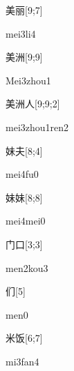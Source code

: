 \begin{verbete}[mei3li4]{美丽}[9;7]
\begin{pronuncia}{mei3li4}
\end{pronuncia}
\end{verbete}

\begin{verbete}{美洲}[9;9]
\begin{pronuncia}{Mei3zhou1}
\end{pronuncia}
\end{verbete}

\begin{verbete}{美洲人}[9;9;2]
\begin{pronuncia}{mei3zhou1ren2}
\end{pronuncia}
\end{verbete}

\begin{verbete}[mei4fu0]{妹夫}[8;4]
\begin{pronuncia}{mei4fu0}
\end{pronuncia}
\end{verbete}

\begin{verbete}{妹妹}[8;8]
\begin{pronuncia}{mei4mei0}
\end{pronuncia}
\end{verbete}

\begin{verbete}{门口}[3;3]
\begin{pronuncia}{men2kou3}
\end{pronuncia}
\end{verbete}

\begin{verbete}[men0]{们}[5]
\begin{pronuncia}{men0}
\end{pronuncia}
\end{verbete}

\begin{verbete}[mi3fan4]{米饭}[6;7]
\begin{pronuncia}{mi3fan4}
\end{pronuncia}
\end{verbete}

